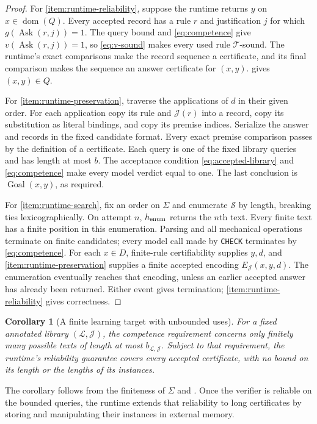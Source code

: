 \documentclass[11pt,twoside]{article}
\newtheorem{corollary}[theorem]{Corollary}
\theoremstyle{definition}
\newcommand{\Stext}{\mathcal S}
\newcommand{\True}{\mathcal T}
\newcommand{\Lib}{\mathcal L}
\newcommand{\Annot}{\mathcal J}
\newcommand{\Goal}{\operatorname{Goal}}
\newcommand{\Ask}{\operatorname{Ask}}
\newcommand{\dom}{\operatorname{dom}}
\begin{document}
\begin{proof}
For \cref{item:runtime-reliability}, suppose the runtime returns $y$ on
$x\in\dom(Q)$. Every accepted record has a rule $r$ and justification $j$
for which $g(\Ask(r,j))=1$. The query bound and \cref{eq:competence} give
$v(\Ask(r,j))=1$, so \cref{eq:v-sound} makes every used rule
$\True$-sound. The runtime's exact comparisons make the record sequence a
certificate, and its final comparison makes the sequence an answer
certificate for $(x,y)$.  gives
$(x,y)\in Q$.

For \cref{item:runtime-preservation}, traverse the applications of $d$ in
their given order. For each
application copy its rule and $\Annot(r)$ into a record, copy its substitution
as literal bindings, and copy its premise indices. Serialize the answer and
records in the fixed candidate format. Every exact premise comparison
passes by the definition of a certificate. Each query is one of
the fixed library queries and has length at most $b$. The acceptance
condition \cref{eq:accepted-library} and \cref{eq:competence} make every model verdict equal
to one. The last conclusion is $\Goal(x,y)$, as required.

For \cref{item:runtime-search}, fix an order on $\Sigma$ and enumerate
$\Stext$ by length, breaking ties lexicographically. On attempt $n$,
$h_{\rm enum}$ returns the $n$th text. Every finite text has a finite position
in this enumeration. Parsing and all mechanical operations terminate on finite
candidates; every model call
made by \texttt{CHECK} terminates by \cref{eq:competence}. For each $x\in D$,
finite-rule certifiability supplies $y,d$, and
\cref{item:runtime-preservation} supplies a finite accepted encoding
$E_{\Annot}(x,y,d)$. The enumeration eventually reaches that
encoding, unless an earlier accepted answer has already been returned.
Either event gives termination; \cref{item:runtime-reliability} gives
correctness.
\end{proof}

\begin{corollary}[A finite learning target with unbounded uses]
For a fixed annotated library $(\Lib,\Annot)$, the competence requirement
concerns only finitely many possible texts of length at most
$b_{\Lib,\Annot}$. Subject to that
requirement, the runtime's reliability guarantee covers every accepted
certificate, with no bound on its length or the lengths of its instances.
\end{corollary}
The corollary follows from the finiteness of $\Sigma$ and
.
Once the verifier is reliable on the bounded queries, the runtime extends
that reliability to long certificates by storing and manipulating their
instances in external memory.
\end{document}
